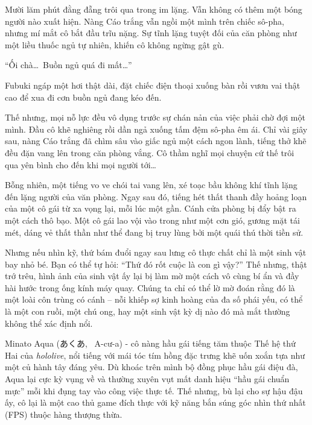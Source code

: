 \documentclass[../main.tex]{subfiles}
\begin{document}
Mười lăm phút đằng đẵng trôi qua trong im lặng. Vẫn không có thêm một bóng người nào xuất hiện. Nàng Cáo trắng vẫn ngồi một mình trên chiếc sô-pha, nhưng mí mắt cô bắt đầu trĩu nặng. Sự tĩnh lặng tuyệt đối của căn phòng như một liều thuốc ngủ tự nhiên, khiến cô không ngừng gật gù.

``Ối chà\dots\ Buồn ngủ quá đi mất\dots''

Fubuki ngáp một hơi thật dài, đặt chiếc điện thoại xuống bàn rồi vươn vai thật cao để xua đi cơn buồn ngủ đang kéo đến.

Thế nhưng, mọi nỗ lực đều vô dụng trước sự chán nản của việc phải chờ đợi một mình. Đầu cô khẽ nghiêng rồi dần ngả xuống tấm đệm sô-pha êm ái. Chỉ vài giây sau, nàng Cáo trắng đã chìm sâu vào giấc ngủ một cách ngon lành, tiếng thở khẽ đều đặn vang lên trong căn phòng vắng. Cô thầm nghĩ mọi chuyện cứ thế trôi qua yên bình cho đến khi mọi người tới\dots

Bỗng nhiên, một tiếng vo ve chói tai vang lên, xé toạc bầu không khí tĩnh lặng đến lặng người của văn phòng. Ngay sau đó, tiếng hét thất thanh đầy hoảng loạn của một cô gái từ xa vọng lại, mỗi lúc một gần. Cánh cửa phòng bị đẩy bật ra một cách thô bạo. Một cô gái lao vội vào trong như một cơn gió, gương mặt tái mét, dáng vẻ thất thần như thể đang bị truy lùng bởi một quái thú thời tiền sử.

Nhưng nếu nhìn kỹ, thứ bám đuổi ngay sau lưng cô thực chất chỉ là một sinh vật bay nhỏ bé. Bạn có thể tự hỏi: ``Thứ đó rốt cuộc là con gì vậy?'' Thế nhưng, thật trớ trêu, hình ảnh của sinh vật ấy lại bị làm mờ một cách vô cùng bí ẩn và đầy hài hước trong ống kính máy quay. Chúng ta chỉ có thể lờ mờ đoán rằng đó là một loài côn trùng có cánh – nỗi khiếp sợ kinh hoàng của đa số phái yếu, có thể là một con ruồi, một chú ong, hay một sinh vật kỳ dị nào đó mà mắt thường không thể xác định nổi.

\chrint


Minato Aqua (あくあ, \ A-cư-a) - cô nàng hầu gái tiếng tăm thuộc Thế hệ thứ Hai của \textit{hololive}, nổi tiếng với mái tóc tím hồng đặc trưng khẽ uốn xoắn tựa như một củ hành tây đáng yêu. Dù khoác trên mình bộ đồng phục hầu gái điệu đà, Aqua lại cực kỳ vụng về và thường xuyên vụt mất danh hiệu ``hầu gái chuẩn mực'' mỗi khi đụng tay vào công việc thực tế. Thế nhưng, bù lại cho sự hậu đậu ấy, cô lại là một cao thủ game đích thực với kỹ năng bắn súng góc nhìn thứ nhất (FPS) thuộc hàng thượng thừa.
\end{document}
